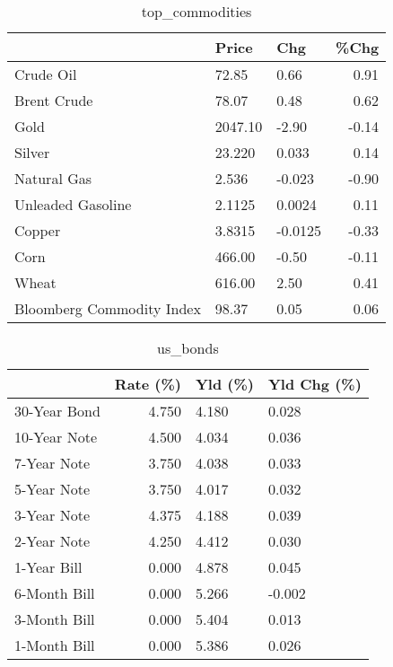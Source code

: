 \documentclass{article}%
\begin{document}
\begin{table}[htbp]%
\caption{top\_commodities}%
\centering%
\begin{adjustbox}{width=1\textwidth}%
\begin{tabular}{lllr}
\toprule
                          &   Price &     Chg &  \%Chg \\
\midrule
               Crude Oil  &   72.85 &    0.66 &  0.91 \\
             Brent Crude  &   78.07 &    0.48 &  0.62 \\
                    Gold  & 2047.10 &   -2.90 & -0.14 \\
                  Silver  &  23.220 &   0.033 &  0.14 \\
             Natural Gas  &   2.536 &  -0.023 & -0.90 \\
       Unleaded Gasoline  &  2.1125 &  0.0024 &  0.11 \\
                  Copper  &  3.8315 & -0.0125 & -0.33 \\
                    Corn  &  466.00 &   -0.50 & -0.11 \\
                   Wheat  &  616.00 &    2.50 &  0.41 \\
Bloomberg Commodity Index &   98.37 &    0.05 &  0.06 \\
\bottomrule
\end{tabular}
%
\end{adjustbox}%
\end{table}

%


\begin{table}[htbp]%
\caption{us\_bonds}%
\centering%
\begin{adjustbox}{width=1\textwidth}%
\begin{tabular}{lrll}
\toprule
             &  Rate (\%) & Yld (\%) & Yld Chg (\%) \\
\midrule
30-Year Bond &     4.750 &   4.180 &       0.028 \\
10-Year Note &     4.500 &   4.034 &       0.036 \\
 7-Year Note &     3.750 &   4.038 &       0.033 \\
 5-Year Note &     3.750 &   4.017 &       0.032 \\
 3-Year Note &     4.375 &   4.188 &       0.039 \\
 2-Year Note &     4.250 &   4.412 &       0.030 \\
 1-Year Bill &     0.000 &   4.878 &       0.045 \\
6-Month Bill &     0.000 &   5.266 &      -0.002 \\
3-Month Bill &     0.000 &   5.404 &       0.013 \\
1-Month Bill &     0.000 &   5.386 &       0.026 \\
\bottomrule
\end{tabular}
%
\end{adjustbox}%
\end{table}
\end{document}

